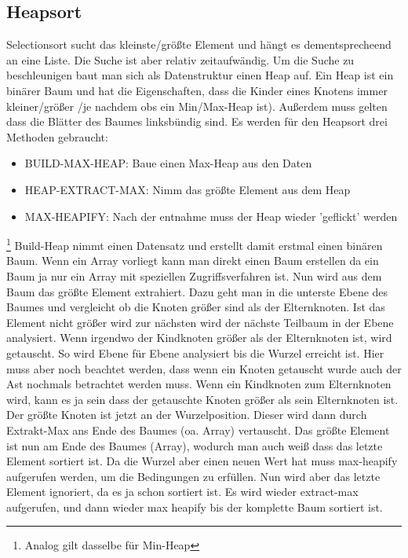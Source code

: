 \documentclass[a4paper]{scrartcl}
\begin{document}
        \subsection{Heapsort}
            Selectionsort sucht das kleinste/größte Element und hängt es dementsprecheend an eine Liste. Die Suche ist aber relativ zeitaufwändig. Um die 
            Suche zu beschleunigen baut man sich als Datenstruktur einen Heap auf. Ein Heap ist ein binärer Baum und hat die Eigenschaften, dass die Kinder 
            eines Knotens immer kleiner/größer /je nachdem obs ein Min/Max-Heap ist). Außerdem muss gelten dass die Blätter des Baumes linksbündig sind.
            Es werden für den Heapsort drei Methoden gebraucht:
            \begin{itemize}
                \item BUILD-MAX-HEAP: Baue einen Max-Heap aus den Daten
                \item HEAP-EXTRACT-MAX: Nimm das größte Element aus dem Heap
                \item MAX-HEAPIFY: Nach der entnahme muss der Heap wieder 'geflickt' werden
            \end{itemize} \footnote{Analog gilt dasselbe für Min-Heap}
            Build-Heap nimmt einen Datensatz und erstellt damit erstmal einen binären Baum. Wenn ein Array vorliegt kann man direkt einen Baum erstellen
            da ein Baum ja nur ein Array mit speziellen Zugriffsverfahren ist. Nun wird aus dem Baum das größte Element extrahiert. Dazu geht man in die unterste Ebene
            des Baumes und vergleicht ob die Knoten größer sind als der Elternknoten. Ist das Element nicht größer wird zur nächsten wird der nächste Teilbaum in der Ebene
            analysiert. Wenn irgendwo der Kindknoten größer als der Elternknoten ist, wird getauscht. So wird Ebene für Ebene analysiert bis die Wurzel erreicht ist. Hier muss
            aber noch beachtet werden, dass wenn ein Knoten getauscht wurde auch der Ast nochmals betrachtet werden muss. Wenn ein Kindknoten zum Elternknoten wird, kann
            es ja sein dass der getauschte Knoten größer als sein Elternknoten ist. Der größte Knoten ist jetzt an der Wurzelposition. Dieser wird dann durch Extrakt-Max
            ans Ende des Baumes (oa. Array) vertauscht. Das größte Element ist nun am Ende des Baumes (Array), wodurch man auch weiß dass das letzte Element sortiert ist.
            Da die Wurzel aber einen neuen Wert hat muss max-heapify aufgerufen werden, um die Bedingungen zu erfüllen. Nun wird aber das letzte Element ignoriert, da es ja
            schon sortiert ist. Es wird wieder extract-max aufgerufen, und dann wieder max heapify bis der komplette Baum sortiert ist.
\end{document}
